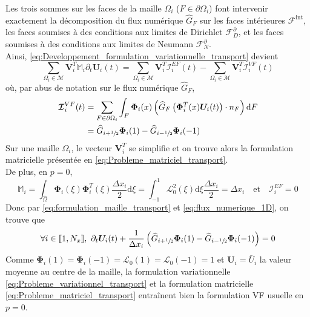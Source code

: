 \documentclass[11pt, a4paper, oneside]{report}
\begin{document}
\begin{appendices}
Les trois sommes sur les faces de la maille $\Omega_i$ ($F \in \partial \Omega_i$) font intervenir exactement la décomposition du flux numérique $\widehat{G}_F$ sur les faces intérieures $\mathcal{F}^\text{int}$, les faces soumises à des conditions aux limites de Dirichlet $\mathcal{F}_D^\partial$, et les faces soumises à des conditions aux limites de Neumann $\mathcal{F}_N^\partial$. \\
Ainsi, \eqref{eq:Developpement_formulation_variationnelle_transport} devient
\begin{equation} \label{eq:formulation_maille_transport}
    \sum_{\Omega_i \in \mathcal{M}} \bm{V}_i^T \mathbb{M}_i \partial_t \bm{U}_i(t) = \sum_{\Omega_i \in \mathcal{M}} \bm{V}_i^T \bm{\mathcal{I}}_i^{EF}(t) - \sum_{\Omega_i \in \mathcal{M}} \bm{V}_i^T \bm{\mathcal{I}}_i^{VF}(t)
\end{equation}
où, par abus de notation sur le flux numérique $\widehat{G}_F$,
\begin{equation} \label{eq:flux_numerique_1D}
    \begin{aligned}
        &\bm{\mathcal{I}}_i^{VF}(t) = \sum_{F \in \partial \Omega_i} \int_F \bm{\Phi}_i(x) \left( \widehat{G}_F \left( \bm{\Phi}_i^T(x) \bm{U}_i(t) \right) \cdot n_F \right) \text{d}F \\
        &\phantom{\bm{\mathcal{I}}_i^{VF}(t) } = \widehat{G}_{i+\sfrac{1}{2}} \bm{\Phi}_i(1) - \widehat{G}_{i-\sfrac{1}{2}} \bm{\Phi}_i(-1)
    \end{aligned}
\end{equation}
Sur une maille $\Omega_i$, le vecteur $\bm{V}_i^T$ se simplifie et on trouve alors la formulation matricielle présentée en \eqref{eq:Probleme_matriciel_transport}. \\
De plus, en $p = 0$,
\begin{equation}
    \mathbb{M}_i = \int_{\widehat{\Omega}} \bm{\Phi}_i(\xi) \bm{\Phi}_i^T(\xi) \frac{\Delta x_i}{2} \text{d}\xi = \int_{-1}^1 \mathcal{L}_0^2(\xi) \text{d}\xi \frac{\Delta x_i}{2} = \Delta x_i \quad \text{et} \quad \bm{\mathcal{I}}_i^{EF} = 0
\end{equation}
Donc par \eqref{eq:formulation_maille_transport} et \eqref{eq:flux_numerique_1D}, on trouve que
\begin{equation}
    \forall i \in \llbracket 1, N_x \rrbracket, ~ \partial_t \bm{U}_i(t) + \frac{1}{\Delta x_i} \left( \widehat{G}_{i+\sfrac{1}{2}} \bm{\Phi}_i(1) - \widehat{G}_{i-\sfrac{1}{2}}\bm{\Phi}_i(-1) \right) = 0
\end{equation}
Comme $\bm{\Phi}_i(1) = \bm{\Phi}_i(-1) = \mathcal{L}_0(1) = \mathcal{L}_0(-1) = 1$ et $\bm{U}_i = \bar{U}_i$ la valeur moyenne au centre de la maille, la formulation variationnelle \eqref{eq:Probleme_variationnel_transport} et la formulation matricielle \eqref{eq:Probleme_matriciel_transport} entraînent bien la formulation VF usuelle en $p = 0$. \\


\end{appendices}
\end{document}
